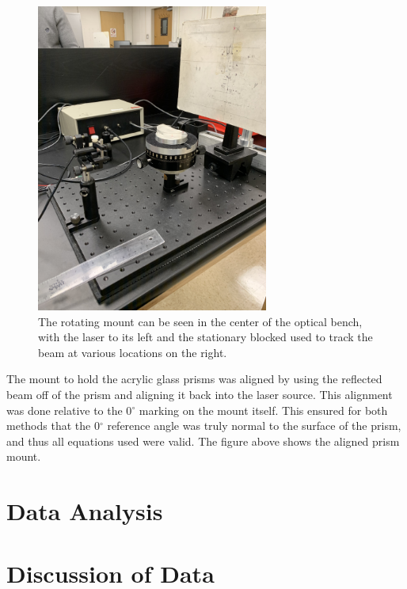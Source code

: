 \documentclass[colorlinks=true,pdfstartview=FitV,linkcolor=blue,
            citecolor=red,urlcolor=magenta]{basedoc}
\begin{document}
    \begin{figure}[!h]
      \begin{center}
      \includegraphics[angle=270,width=3in]{resources/prism_mount.jpeg}
      \caption{The rotating mount can be seen in the center of the optical bench, with the laser to its left and the stationary blocked used to track the beam at various locations on the right.}
      \label{fig:prism_mount}
      \end{center}
    \end{figure}

  The mount to hold the acrylic glass prisms was aligned by using the reflected beam off of the prism and aligning it back into the laser source. This alignment was done relative to the 0$^{\circ}$ marking on the mount itself. This ensured for both methods that the 0$^{\circ}$ reference angle was truly normal to the surface of the prism, and thus all equations used were valid. The figure above shows the aligned prism mount.







\section{Data Analysis}



\section{Discussion of Data}
  
\end{document}
